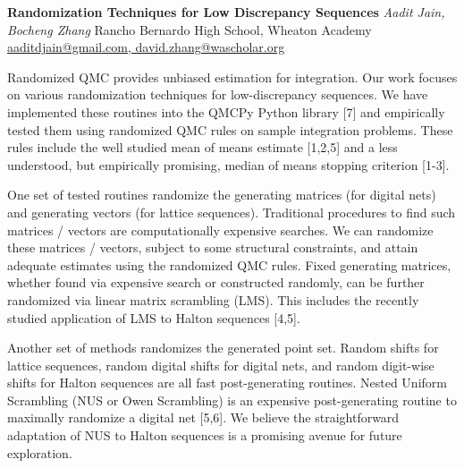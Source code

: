 \documentclass[12pt,a4paper,figuresright]{book}
\newenvironment{talk}[6]%
 {%
  \vskip 0pt\nopagebreak%
 \vskip 0pt\nopagebreak%
  \textbf{#1}\vspace{3mm}
  \newline%
  \nopagebreak%
  \textit{#2}
  \newline%
  \nopagebreak%
  #3
  \newline%
  \nopagebreak%
  \url{#4}\vspace{3mm}
  \newline%
  \nopagebreak%
  \ifthenelse{\equal{#5}{}}{}{Coauthor(s): #5\vspace{3mm}
  \newline%
  \nopagebreak}%
  \ifthenelse{\equal{#6}{}}{}{Special session: #6\quad \vspace{3mm}
  \newline%
  \nopagebreak}%
 }
 {\vspace{1cm}
 \nopagebreak}%
\begin{document}
\begin{talk}
  {Randomization Techniques for Low Discrepancy Sequences}%
  {Aadit Jain, Bocheng Zhang}%
  {Rancho Bernardo High School, Wheaton Academy}%
  {aaditdjain@gmail.com, david.zhang@wascholar.org}%
  {}%
  {}%

				
				

Randomized QMC provides unbiased estimation for integration. Our work focuses on various randomization techniques for low-discrepancy sequences. We have implemented these routines into the QMCPy Python library [7] and empirically tested them using randomized QMC rules on sample integration problems. These rules include the well studied mean of means estimate [1,2,5] and a less understood, but empirically promising, median of means stopping criterion [1-3]. 

One set of tested routines randomize the generating matrices (for digital nets) and generating vectors (for lattice sequences). Traditional procedures to find such matrices / vectors are computationally expensive searches.  We can randomize these matrices / vectors, subject to some structural constraints, and attain adequate estimates using the randomized QMC rules. Fixed generating matrices, whether found via expensive search or constructed randomly, can be further randomized via linear matrix scrambling (LMS). This includes the recently studied application of LMS to Halton sequences [4,5].

Another set of methods randomizes the generated point set. Random shifts for lattice sequences, random digital shifts for digital nets, and random digit-wise shifts for Halton sequences are all fast post-generating routines.   Nested Uniform Scrambling (NUS or Owen Scrambling) is an expensive post-generating routine to maximally randomize a digital net [5,6]. We believe the straightforward adaptation of NUS to Halton sequences is a promising avenue for future exploration. 



\medskip



\end{talk}
\end{document}
